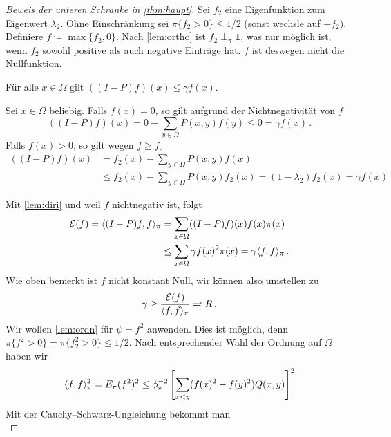 \documentclass[ngerman,a4paper,11pt]{scrartcl}
\newcommand{\diri}{\mathcal{E}}
\DeclarePairedDelimiter{\sprod}{\langle}{\rangle}	%
\begin{document}
\begin{proof}[Beweis der unteren Schranke in \cref{thm:haupt}]
 Sei $f_2$ eine Eigenfunktion zum Eigenwert $\lambda_2$. Ohne Einschränkung sei
 $\pi\{f_2>0\}\leq 1/2$ (sonst wechsle auf $-f_2$). \\
 Definiere $f\coloneqq\max\{f_2,0\}$.
 Nach \cref{lem:ortho} ist $f_2\perp_\pi\mathbf{1}$, was nur möglich ist, wenn
 $f_2$ sowohl positive als auch negative Einträge hat. $f$ ist deswegen nicht die Nullfunktion.
 \begin{claim}
  Für alle $x\in\Omega$ gilt $((I-P)f)(x)\leq\gamma f(x)$.
 \end{claim}
 \begin{dproof}
  Sei $x\in\Omega$ beliebig. Falls $f(x)=0$, so gilt aufgrund der Nichtnegativität von $f$
  \begin{equation*}
   ((I-P)f)(x)=0-\sum_{y\in\Omega}P(x,y)f(y)\leq 0=\gamma f(x)\, . 
  \end{equation*}
  Falls $f(x)>0$, so gilt wegen $f\geq f_2$
  \begin{align*}
   ((I-P)f)(x)&=f_2(x)-\sum_{y\in\Omega}P(x,y)f(x) \\
   &\leq f_2(x)-\sum_{y\in\Omega}P(x,y)f_2(x)=(1-\lambda_2)f_2(x)=\gamma f(x)
  \end{align*} 
 \end{dproof}
 Mit \cref{lem:diri} und weil $f$ nichtnegativ ist, folgt
 \begin{align*}
  \begin{split}
   \diri(f)=\sprod{(I-P)f,f}_\pi&=\sum_{x\in\Omega}((I-P)f)(x)f(x)\pi(x) \\
   &\leq \sum_{x\in\Omega}\gamma f(x)^2\pi(x)=\gamma\sprod{f,f}_\pi\, .
  \end{split}
 \end{align*}
 Wie oben bemerkt ist $f$ nicht konstant Null, wir können also umstellen zu
 \begin{equation}
  \label{eq:R}
  \gamma\geq\frac{\diri(f)}{\sprod{f,f}_\pi}\eqqcolon R\, . 
 \end{equation}
 Wir wollen \cref{lem:ordn} für $\psi=f^2$ anwenden. Dies ist möglich, denn
 $\pi\{f^2>0\}=\pi\{f_2^2>0\}\leq 1/2$. Nach entsprechender Wahl der Ordnung auf
 $\Omega$ haben wir
 \begin{equation*}
  \sprod{f,f}_\pi^2=E_\pi(f^2)^2\leq\phi_\star^{-2}\left[ \sum_{x<y}(f(x)^2-f(y)^2)Q(x,y) \right]^2
 \end{equation*}
 Mit der Cauchy--Schwarz-Ungleichung bekommt man
 \begin{equation}

\end{equation}
\end{proof}
\end{document}
